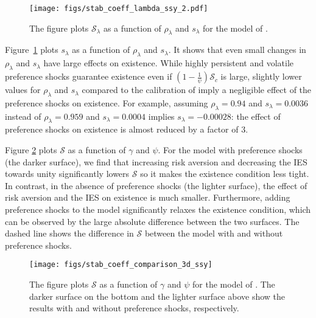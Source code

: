 \documentclass[12pt, reqno]{amsart}
\newcommand{\1}{\mathbbm 1}
\newcommand{\sS}{\mathscr S}
\theoremstyle{plain}
\theoremstyle{definition}
\begin{document}
\begin{figure}
	\centering
	\texttt{[image: figs/stab\_coeff\_lambda\_ssy\_2.pdf]}
	\caption{\label{f:stab_coeff_lambda_ssy_2} The figure plots $\sS_\lambda$ as a function of $\rho_\lambda $
		and $s_\lambda$ for the model of \cite{schorfheide2018identifying}.}
\end{figure}

Figure~\ref{f:stab_coeff_lambda_ssy_2}
plots $s_\lambda$ as a function of $\rho_\lambda$ and $s_\lambda$.
It shows that even small changes in $\rho_\lambda$ and $s_\lambda$ have large
effects on existence. While highly persistent and volatile preference shocks
guarantee existence even if $\left(1-\frac{1}{\psi}\right) \sS_c$ is large,
slightly lower values for $\rho_\lambda$ and $s_\lambda$ compared to the
calibration of  \cite{schorfheide2018identifying} imply a negligible effect of
the preference shocks on existence. For example, assuming  $\rho_\lambda =
0.94$ and $s_\lambda = 0.0036$ instead of  $\rho_\lambda = 0.959$ and
$s_\lambda = 0.0004$ implies $s_\lambda = -0.00028$: the effect of
preference shocks on existence is almost reduced by a factor of 3. 

Figure \ref{f:stab_coeff_comparison_3d_ssy} plots $\sS$ as a function of
$\gamma$ and $\psi$. For the model with preference shocks (the darker
surface), we find that increasing risk aversion and decreasing the IES towards
unity significantly lowers $\sS$ so it makes the existence condition less
tight. In contrast, in the absence of preference shocks (the lighter
surface), the effect of risk aversion and the IES on existence is much
smaller. Furthermore, adding preference shocks to the model significantly
relaxes the existence condition, which can be observed by the large absolute
difference between the two surfaces. The dashed line shows the difference in
$\sS$ between the model with and without preference shocks.

 \begin{figure}
	\centering
	\texttt{[image: figs/stab\_coeff\_comparison\_3d\_ssy]}
	\caption{\label{f:stab_coeff_comparison_3d_ssy}The figure plots $\sS$ as
      a function of $\gamma$ and $\psi$ for the model of
      \cite{schorfheide2018identifying}. The darker surface on the bottom and
      the lighter surface above show the results with and without preference
      shocks, respectively.}
\end{figure}
\end{document}
